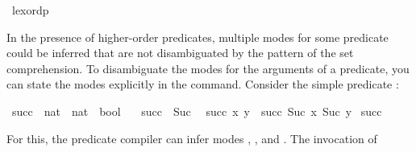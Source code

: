 \begin{isabellebody}
\isamarkupfalse%
\ lexordp%
\endisatagquote
{\isafoldquote}%
%
\isadelimquote
%
\endisadelimquote
%
\isamarkuptrue%
%
\begin{isamarkuptext}%
In the presence of higher-order predicates, multiple modes for some
  predicate could be inferred that are not disambiguated by the
  pattern of the set comprehension.  To disambiguate the modes for the
  arguments of a predicate, you can state the modes explicitly in the
  \hyperlink{command.values}{\mbox{}} command.  Consider the simple predicate :%
\end{isamarkuptext}%
\isamarkuptrue%
%
\isadelimquote
%
\endisadelimquote
%
\isatagquote
{}\isamarkupfalse%
\ succ\ {}{}\ {}nat\ {}\ nat\ {}\ bool{}\ \isanewline
\ \ {}succ\ {}\ {}Suc\ {}{}{}\isanewline
{}\ {}succ\ x\ y\ {}\ succ\ {}Suc\ x{}\ {}Suc\ y{}{}\isanewline
\isanewline
{}\isamarkupfalse%
\ succ\ \isamarkupfalse%
%
\endisatagquote
{\isafoldquote}%
%
\isadelimquote
%
\endisadelimquote
%
\begin{isamarkuptext}%
\noindent For this, the predicate compiler can infer modes , ,  and
  .  The invocation of \hyperlink{command.values}{\mbox{}}

\end{isamarkuptext}
\end{isabellebody}
